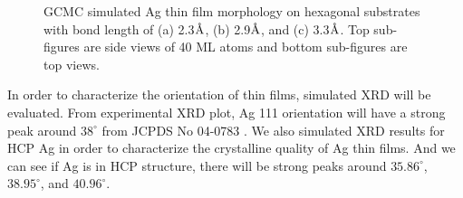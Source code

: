 \begingroup
\begin{figure}[!ht]
  \centering
  \label{Chap:Ag/ZnO:fig:5a}
  \label{Chap:Ag/ZnO:fig:5b}
  \label{Chap:Ag/ZnO:fig:5c}
\caption[GCMC simulated Ag thin film morphology on hexagonal substrates.]{GCMC simulated Ag thin film morphology on hexagonal substrates with bond length of (a) 2.3$\mbox{\normalfont\AA}$, (b) 2.9$\mbox{\normalfont\AA}$, and (c) 3.3$\mbox{\normalfont\AA}$. Top sub-figures are side views of 40 \ac{ML} atoms and bottom sub-figures are top views.}
  \label{Chap:Ag/ZnO:fig5}
\end{figure}
\endgroup

In order to characterize the orientation of thin films, simulated \ac{XRD} will be evaluated. From experimental \ac{XRD} plot, Ag {111} orientation will have a strong peak around $38^{\circ}$ from JCPDS No 04-0783 \cite{AgPDF}. We also simulated \ac{XRD} results for \ac{HCP} Ag in order to characterize the crystalline quality of Ag thin films. And we can see if Ag is in \ac{HCP} structure, there will be strong peaks around $35.86^{\circ}$, $38.95^{\circ}$, and $40.96^{\circ}$.

